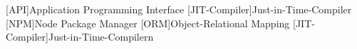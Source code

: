 [API]{Application Programming Interface}
[JIT-Compiler]{Just-in-Time-Compiler}
[NPM]{Node Package Manager}
[ORM]{Object-Relational Mapping}
[JIT-Compiler]{Just-in-Time-Compilern}
